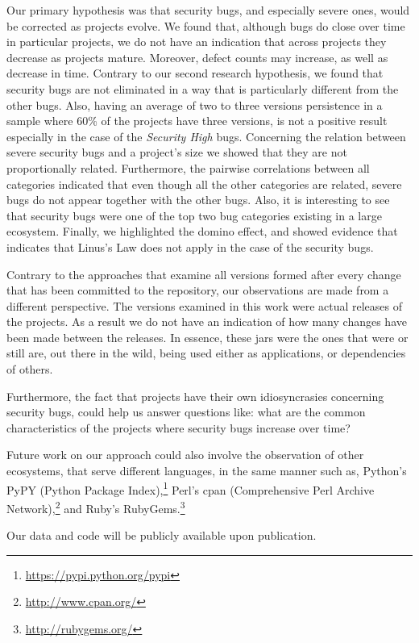 \documentclass{sig-alternate}
\begin{document}
Our primary hypothesis was that security bugs, and especially severe
ones, would be corrected as projects evolve. We found that, although
bugs do close over time in particular projects, we do not have an indication that across
projects they decrease as projects mature. Moreover, defect counts may
increase, as well as decrease in time. Contrary to our second research hypothesis,
we found that security
bugs are not eliminated in a way that is particularly different from the other bugs.
Also, having an average of two to three versions persistence in a sample where 60\%
of the projects have three versions, is not a positive result especially in the
case of the {\it Security High} bugs. Concerning the relation between
severe security bugs and a project's size
we showed that they are not proportionally related. Furthermore, the
pairwise correlations between all categories indicated that even though all the other
categories are related, severe bugs do not appear together with the other bugs.
Also, it is interesting to see that security bugs were one of the top two
bug categories existing in a large ecosystem. Finally, we highlighted the
domino effect, and showed evidence that indicates that Linus's Law does not
apply in the case of the security bugs.

Contrary to the approaches that examine all versions
formed after every change that has been committed to the repository,
our observations are made from a different perspective.
The versions examined in this work were actual releases
of the projects. As a result we do not have an indication of how many changes
have been made between the releases.
In essence, these {\sc jar}s were the ones that were or still are,
out there in the wild, being used either as applications,
or dependencies of others.

Furthermore, the fact that projects have their own idiosyncrasies concerning
security bugs, could help us answer questions like: what are the common
characteristics of the projects where security bugs increase over time?

Future work on our approach could also involve the observation of other ecosystems, that
serve different languages, in the same manner such as, Python's PyPY
(Python Package Index),\footnote{\url{https://pypi.python.org/pypi}}
Perl's {\sc cpan} (Comprehensive Perl Archive Network),\footnote{\url{http://www.cpan.org/}}
and Ruby's RubyGems.\footnote{\url{http://rubygems.org/}}

Our data and code will be publicly available upon publication.
\end{document}
